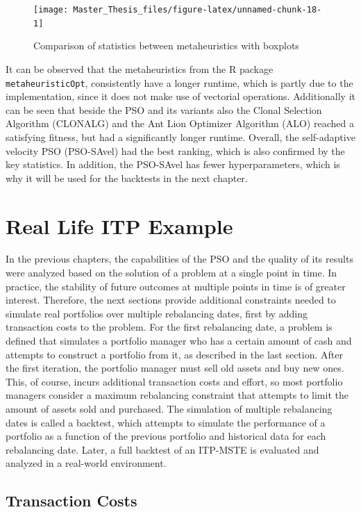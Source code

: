 \documentclass[
  oneside, a4paper, 12pt, openany]{book}
\theoremstyle{definition}
\theoremstyle{definition}
\theoremstyle{definition}
\theoremstyle{definition}
\theoremstyle{remark}
\begin{document}
\begin{figure}[H]
\texttt{[image: Master\_Thesis\_files/figure-latex/unnamed-chunk-18-1]} \caption{Comparison of statistics between metaheuristics with boxplots}\label{fig:unnamed-chunk-18}
\end{figure}

It can be observed that the metaheuristics from the R package \texttt{metaheuristicOpt}, consistently have a longer runtime, which is partly due to the implementation, since it does not make use of vectorial operations. Additionally it can be seen that beside the PSO and its variants also the Clonal Selection Algorithm (CLONALG) and the Ant Lion Optimizer Algorithm (ALO) reached a satisfying fitness, but had a significantly longer runtime. Overall, the self-adaptive velocity PSO (PSO-SAvel) had the best ranking, which is also confirmed by the key statistics. In addition, the PSO-SAvel has fewer hyperparameters, which is why it will be used for the backtests in the next chapter.

\hypertarget{reallife}{%
\chapter{Real Life ITP Example}\label{reallife}}

In the previous chapters, the capabilities of the PSO and the quality of its results were analyzed based on the solution of a problem at a single point in time. In practice, the stability of future outcomes at multiple points in time is of greater interest. Therefore, the next sections provide additional constraints needed to simulate real portfolios over multiple rebalancing dates, first by adding transaction costs to the problem. For the first rebalancing date, a problem is defined that simulates a portfolio manager who has a certain amount of cash and attempts to construct a portfolio from it, as described in the last section. After the first iteration, the portfolio manager must sell old assets and buy new ones. This, of course, incurs additional transaction costs and effort, so most portfolio managers consider a maximum rebalancing constraint that attempts to limit the amount of assets sold and purchased. The simulation of multiple rebalancing dates is called a backtest, which attempts to simulate the performance of a portfolio as a function of the previous portfolio and historical data for each rebalancing date. Later, a full backtest of an ITP-MSTE is evaluated and analyzed in a real-world environment.

\hypertarget{transaction-costs}{%
\section{Transaction Costs}\label{transaction-costs}}
\end{document}
